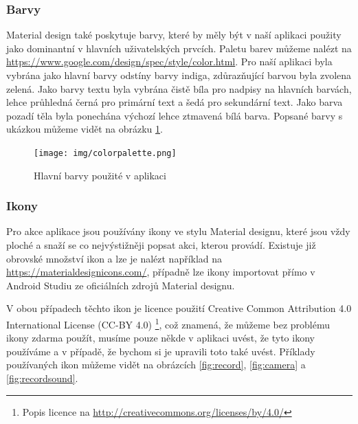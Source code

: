 \documentclass[czech,master,public,dept460,male,java,cpdeclaration]{diploma}
\begin{document}
\subsubsection{Barvy}
  Material design také poskytuje barvy, které by měly být v naší aplikaci použity jako dominantní v hlavních
  uživatelských prvcích. Paletu barev můžeme nalézt na \url{https://www.google.com/design/spec/style/color.html}.
  Pro naší aplikaci byla vybrána jako hlavní barvy odstíny barvy indiga, zdůrazňující barvou byla zvolena zelená.
  Jako barvy textu byla vybrána čistě bíla pro nadpisy na hlavních barvách, lehce průhledná černá pro
  primární text a šedá pro sekundární text. Jako barva pozadí těla byla ponechána výchozí lehce ztmavená bílá
  barva. Popsané barvy s ukázkou můžeme vidět na obrázku \ref{fig:colorpalette}.

  \begin{figure}[H]
          \centering
                  \texttt{[image: img/colorpalette.png]}
          \caption{Hlavní barvy použité v aplikaci}
          \label{fig:colorpalette}
  \end{figure}

\subsubsection{Ikony}
Pro akce aplikace jsou používány ikony ve stylu Material designu, které jsou vždy ploché
a snaží se co nejvýstižněji popsat akci, kterou provádí. Existuje již obrovské množství
ikon a lze je nalézt například na \url{https://materialdesignicons.com/}, případně lze ikony
importovat přímo v Android Studiu ze oficiálních zdrojů Material designu.

V obou případech těchto ikon je licence použití Creative Common Attribution 4.0 International License (CC-BY 4.0)
\footnote{Popis licence na \url{http://creativecommons.org/licenses/by/4.0/}}, což znamená,
že můžeme bez problému ikony zdarma použít, musíme pouze někde v aplikaci uvést, že tyto ikony
používáme a v případě, že bychom si je upravili toto také uvést.
Příklady používaných ikon můžeme vidět na obrázcích \ref{fig:record}, \ref{fig:camera} a \ref{fig:recordsound}.
\end{document}
